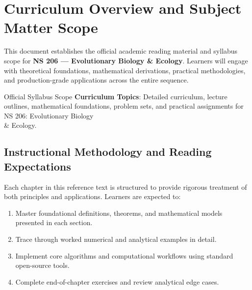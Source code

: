 \section{Curriculum Overview and Subject Matter Scope}

This document establishes the official academic reading material and syllabus scope for \textbf{NS 206 --- Evolutionary Biology \& Ecology}. Learners will engage with theoretical foundations, mathematical derivations, practical methodologies, and production-grade applications across the entire sequence.

\begin{InsightBox}{Official Syllabus Scope}
  \textbf{Curriculum Topics}: Detailed curriculum, lecture outlines, mathematical foundations, problem sets, and practical assignments for NS 206: Evolutionary Biology \\& Ecology.
\end{InsightBox}

\subsection{Instructional Methodology and Reading Expectations}

Each chapter in this reference text is structured to provide rigorous treatment of both principles and applications. Learners are expected to:
\begin{enumerate}
  \item Master foundational definitions, theorems, and mathematical models presented in each section.
  \item Trace through worked numerical and analytical examples in detail.
  \item Implement core algorithms and computational workflows using standard open-source tools.
  \item Complete end-of-chapter exercises and review analytical edge cases.
\end{enumerate}

